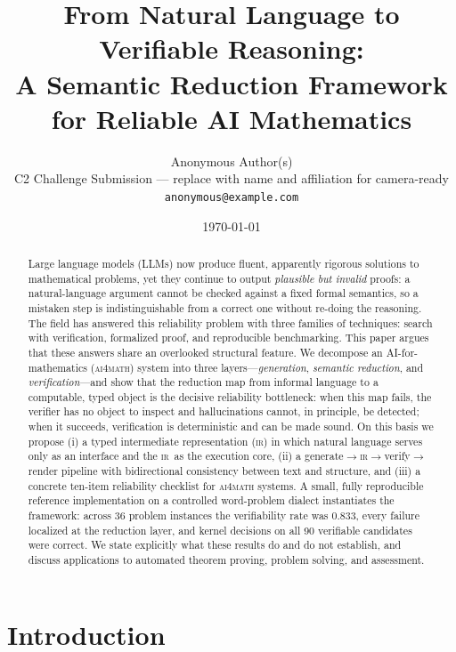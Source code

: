 \documentclass[11pt,a4paper]{article}
\title{\bfseries From Natural Language to Verifiable Reasoning:\\
       A Semantic Reduction Framework for Reliable AI Mathematics}
\author{%
  Anonymous Author(s)\\
  \small C2 Challenge Submission --- replace with name and affiliation for camera-ready\\
  \small \texttt{anonymous@example.com}
}
\date{\today}
\newcommand{\ir}{\textsc{ir}\xspace}
\theoremstyle{plain}
\theoremstyle{definition}
\theoremstyle{remark}
\begin{document}
\maketitle

\begin{abstract}
Large language models (LLMs) now produce fluent, apparently rigorous
solutions to mathematical problems, yet they continue to output
\emph{plausible but invalid} proofs: a natural-language argument cannot be
checked against a fixed formal semantics, so a mistaken step is
indistinguishable from a correct one without re-doing the reasoning. The
field has answered this reliability problem with three families of
techniques: search with verification, formalized proof, and reproducible
benchmarking. This paper argues that these answers share an overlooked
structural feature. We decompose an AI-for-mathematics (\textsc{ai4math})
system into three layers---\emph{generation}, \emph{semantic reduction},
and \emph{verification}---and show that the reduction map from informal
language to a computable, typed object is the decisive reliability
bottleneck: when this map fails, the verifier has no object to inspect and
hallucinations cannot, in principle, be detected; when it succeeds,
verification is deterministic and can be made sound. On this basis we
propose (i) a typed intermediate representation (\ir) in which natural
language serves only as an interface and the \ir\ as the execution core,
(ii) a generate$\to$\ir$\to$verify$\to$render pipeline with bidirectional
consistency between text and structure, and (iii) a concrete ten-item
reliability checklist for \textsc{ai4math} systems. A small, fully
reproducible reference implementation on a controlled word-problem
dialect instantiates the framework: across 36 problem instances the
verifiability rate was $0.833$, every failure localized at the reduction
layer, and kernel decisions on all 90 verifiable candidates were correct.
We state explicitly what these results do and do not establish, and
discuss applications to automated theorem proving, problem solving, and
assessment.
\end{abstract}

\section{Introduction}\label{sec:intro}
\end{document}
